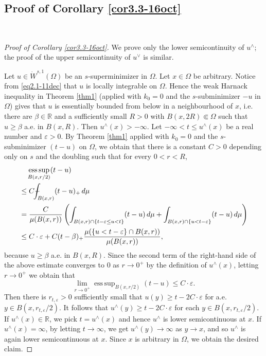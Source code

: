 \documentclass[11pt,leqno]{amsart}
\def\Xint#1{\mathchoice
	{\XXint\displaystyle\textstyle{#1}}
	{\XXint\textstyle\scriptstyle{#1}}
	{\XXint\scriptstyle\scriptscriptstyle{#1}}
	{\XXint\scriptscriptstyle\scriptscriptstyle{#1}}
	\!\int}
\def\XXint#1#2#3{{\setbox0=\hbox{$#1{#2#3}{\int}$ }
		\vcenter{\hbox{$#2#3$ }}\kern-.6\wd0}}
\def\dashint{\Xint-}
\numberwithin{equation}{section}
\theoremstyle{definition}
\DeclareMathOperator*{\esssup}{ess\,sup}
\begin{document}
	\subsection{Proof of Corollary \ref{cor3.3-16oct}}\
	
	\begin{proof}[Proof of Corollary \ref{cor3.3-16oct}]
		We prove only the lower semicontinuity of \(u^\wedge\);
		the proof of the upper semicontinuity of \(u^\vee\) is similar.
		
		Let $u\in \dot W^{s,1}(\Omega)$ be an $s$-superminimizer in $\Omega$.
		Let $x\in \Omega$ be arbitrary. Notice from \eqref{eq2.1-11dec} that
		$u$ is locally integrable on $\Omega$. Hence the weak Harnack inequality in
		Theorem \ref{thm1} (applied with $k_0=0$ and the $s$-subminimizer $-u$ in $\Omega$) gives that
		$u$ is essentially bounded from below in a neighbourhood of $x$, i.e. there are
		$\beta\in\mathbb R$ and a sufficiently small $R>0$ with $B(x,2R)\Subset\Omega$ such that
		$u\geq \beta$ a.e. in $B(x,R)$. Then $u^\wedge(x)>-\infty$.
		Let $-\infty<t\leq u^\wedge(x)$ be a real number and $\varepsilon>0$.
		By Theorem \ref{thm1} applied with $k_0=0$ and the $s$-subminimizer $(t-u)$ on $\Omega$, we obtain
		that there is a constant $C>0$ depending only on $s$ and the doubling 
		such that for every $0<r<R$,
		\begin{align*}
			&\quad \esssup_{B(x,r/2)}(t-u)\\
			&\leq  C\dashint_{B(x,r)} (t-u)_+\,d\mu\\
			&= \frac{C}{\mu(B(x,r))} \left( \int_{B(x,r)\cap \{ t-\varepsilon
				\leq u<t\}}(t-u)\,d\mu+ \int_{B(x,r)\cap \{ u<t-\varepsilon\}}(t-u)\,d\mu \right)\\
			&\leq  C\cdot \varepsilon + C(t-\beta)_+ \frac{\mu(\{u<t-\varepsilon\}\cap B(x,r)) }{\mu(B(x,r))},
		\end{align*}
		because $u\geq \beta$ a.e. in $B(x,R)$. Since the second term of the right-hand side of the above
		estimate converges to $0$ as $r\to 0^+$ by the definition of $u^\wedge(x)$,
		letting $r\to 0^+$ we obtain that 
		\[
		\lim_{r\to0^+}\esssup_{B(x,r/2)}(t-u) \leq C\cdot \varepsilon.
		\]
		Then there is $r_{t,\varepsilon}>0$ sufficiently small
		that $u(y)\geq t-2C\cdot \varepsilon$  for a.e.
		$y\in B(x,r_{t,\varepsilon}/2)$. It follows that $u^\wedge(y)\geq t-2C\cdot\varepsilon$ for each
		$y\in B(x,r_{t,\varepsilon}/2)$. If $u^\wedge(x)\in\mathbb R$, we pick $t=u^\wedge(x)$ and
		hence $u^\wedge$ is lower semicontinuous at $x$. If $u^\wedge(x)=\infty$, by letting $t\to\infty$,
		we get $u^\wedge(y)\to\infty$ as $y\to x$, and so $u^\wedge$ is again
		lower semicontinuous at $x$.
		Since $x$ is arbitrary in $\Omega$, we obtain the  desired claim.
	\end{proof}
	
\end{document}
